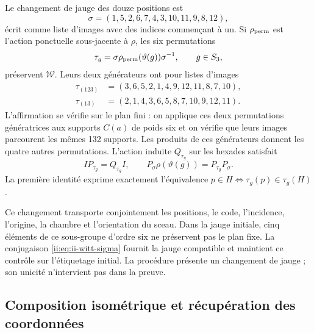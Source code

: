 Le changement de jauge des douze positions est
\begin{equation}
 \sigma=(1,5,2,6,7,4,3,10,11,9,8,12),
 \label{ii:eq:ii-witt-sigma}
\end{equation}
écrit comme liste d’images avec des indices commençant à un. Si
\(\rho_{\rm perm}\) est l’action ponctuelle sous-jacente à \(\rho\), les
six permutations
\[
 \tau_g=\sigma\rho_{\rm perm}(\vartheta(g))\sigma^{-1},\qquad g\in S_3,
\]
préservent \(\mathcal W\). Leurs deux générateurs ont pour listes d’images
\[
\begin{aligned}
 \tau_{(123)}&=(3,6,5,2,1,4,9,12,11,8,7,10),\\
 \tau_{(13)}&=(2,1,4,3,6,5,8,7,10,9,12,11).
\end{aligned}
\]
L’affirmation se vérifie sur le plan fini : on applique ces deux
permutations génératrices aux supports
\(C(a)\) de poids six et on vérifie que leurs images parcourent les
mêmes 132 supports. Les produits de ces générateurs donnent les quatre
autres permutations. L’action induite \(Q_{\tau_g}\) sur les hexades
satisfait
\begin{equation}
 I P_{\tau_g}=Q_{\tau_g}I,
 \qquad
 P_\sigma\rho(\vartheta(g))=P_{\tau_g}P_\sigma.
 \label{ii:eq:ii-witt-recalibration}
\end{equation}
La première identité exprime exactement l’équivalence
\(p\in H\Longleftrightarrow\tau_g(p)\in\tau_g(H)\).

Ce changement transporte conjointement les positions, le code, l’incidence,
l’origine, la chambre et l’orientation du sceau. Dans la jauge initiale, cinq
éléments de ce sous-groupe d’ordre six ne préservent pas le plan fixe.
La conjugaison \eqref{ii:eq:ii-witt-sigma} fournit la jauge compatible
et maintient ce contrôle sur l’étiquetage initial. La procédure
présente un changement de jauge ; son unicité n’intervient pas dans la preuve.

\subsection{Composition isométrique et récupération des coordonnées}

